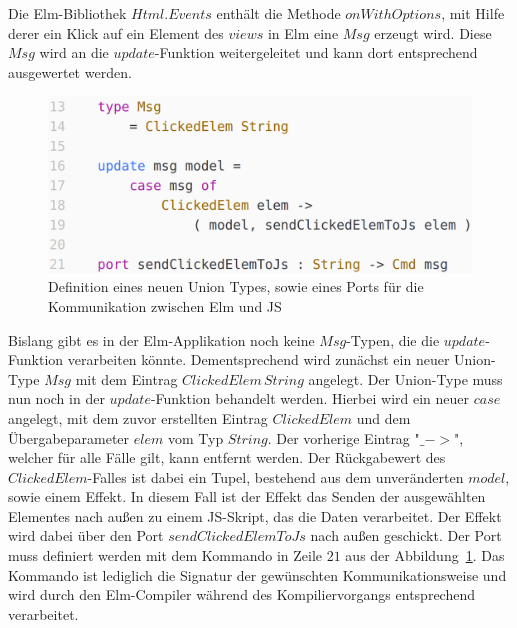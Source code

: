Die Elm-Bibliothek $Html.Events$ enthält die Methode $onWithOptions$, mit Hilfe derer ein Klick auf ein Element des $views$ in Elm eine $Msg$ erzeugt wird. Diese $Msg$ wird an die $update$-Funktion weitergeleitet und kann dort entsprechend ausgewertet werden.
\begin{figure}[htb]
\centering
\includegraphics[scale=0.3]{img/elm-port.png}
\caption{Definition eines neuen Union Types, sowie eines Ports für die Kommunikation zwischen Elm und \ac{JS}}\label{fig:create-port}
\end{figure}
Bislang gibt es in der Elm-Applikation noch keine $Msg$-Typen, die die $update$-Funktion verarbeiten könnte. Dementsprechend wird zunächst ein neuer Union-Type $Msg$ mit dem Eintrag $ClickedElem\,String$ angelegt. Der Union-Type muss nun noch in der $update$-Funktion behandelt werden. Hierbei wird ein neuer $case$ angelegt, mit dem zuvor erstellten Eintrag $ClickedElem$ und dem Übergabeparameter $elem$ vom Typ $String$. Der vorherige Eintrag "$\_ ->$", welcher für alle Fälle gilt, kann entfernt werden. Der Rückgabewert des $ClickedElem$-Falles ist dabei ein Tupel, bestehend aus dem unveränderten $model$, sowie einem Effekt. In diesem Fall ist der Effekt das Senden der ausgewählten Elementes nach außen zu einem \ac{JS}-Skript, das die Daten verarbeitet. Der Effekt wird dabei über den Port $sendClickedElemToJs$ nach außen geschickt. Der Port muss definiert werden mit dem Kommando in Zeile $21$ aus der Abbildung~\ref{fig:create-port}. Das Kommando ist lediglich die Signatur der gewünschten Kommunikationsweise und wird durch den Elm-Compiler während des Kompiliervorgangs entsprechend verarbeitet.

